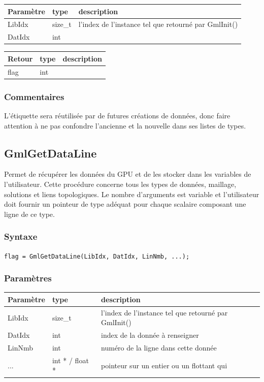 \documentclass[a4paper,12pt]{article}
\begin{document}
\begin{tabular}{|m{2cm}|m{1.5cm}|m{10.5cm}|}
\hline
Paramètre  & type    & description \\
\hline
LibIdx     & size\_t & l'index de l'instance tel que retourné par GmlInit() \\
\hline
DatIdx     & int     & \\
\hline
\end{tabular}

\medskip

\begin{tabular}{|m{2cm}|m{1.5cm}|m{10.5cm}|}
\hline
Retour     & type   & description \\
\hline
flag       & int    & \\
\hline
\end{tabular}

\subsubsection*{Commentaires}
L'étiquette sera réutilisée par de futures créations de données, donc faire attention à ne pas confondre l'ancienne et la nouvelle dans ses listes de types.


\subsection{GmlGetDataLine}

Permet de récupérer les données du GPU et de les stocker dans les variables de l'utilisateur.
Cette procédure concerne tous les types de données, maillage, solutions et liens topologiques.
Le nombre d'arguments est variable et l'utilisateur doit fournir un pointeur de type adéquat pour chaque scalaire composant une ligne de ce type.

\subsubsection*{Syntaxe}

{\tt flag = GmlGetDataLine(LibIdx, DatIdx, LinNmb, ...);}

\subsubsection*{Paramètres}

\begin{tabular}{|m{2cm}|m{1.5cm}|m{10.5cm}|}
\hline
Paramètre  & type            & description \\
\hline
LibIdx     & size\_t         & l'index de l'instance tel que retourné par GmlInit() \\
\hline
DatIdx     & int             & index de la donnée à renseigner \\
\hline
LinNmb     & int             & numéro de la ligne dans cette donnée \\
\hline
...        & int * / float * & pointeur sur un entier ou un flottant qui \\
\hline
\end{tabular}
\end{document}

